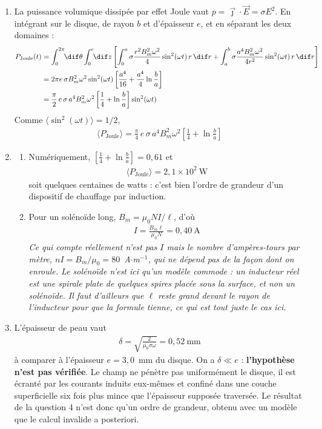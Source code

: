 \begin{correction}
\begin{enumerate}
	\item La puissance volumique dissipée par effet Joule vaut $p=\vec{\jmath}\cdot\vec{E}=\sigma E^2$. En intégrant sur le disque, de rayon $b$ et d'épaisseur $e$, et en séparant les deux domaines :
	\begin{align*}
		P_{\mathrm{Joule}}(t)&=\int_0^{2\pi}\!\!\dif\theta\int_0^e\!\!\dif z\left[\int_0^a\sigma\frac{r^2B_m^2\omega^2}{4}\sin^2(\omega t)\,r\,\dif r+\int_a^b\sigma\frac{a^4B_m^2\omega^2}{4r^2}\sin^2(\omega t)\,r\,\dif r\right]\\
		&=2\pi e\,\sigma B_m^2\omega^2\sin^2(\omega t)\left[\frac{a^4}{16}+\frac{a^4}{4}\ln\frac{b}{a}\right]\\
		&=\frac{\pi}{2}\,e\,\sigma\,a^4B_m^2\omega^2\left[\frac14+\ln\frac{b}{a}\right]\sin^2(\omega t)
	\end{align*}
	Comme $\langle\sin^2(\omega t)\rangle=1/2$,
	\begin{align*}
		\boxed{\langle P_{\mathrm{Joule}}\rangle=\frac{\pi}{4}\,e\,\sigma\,a^4B_m^2\omega^2\left[\frac14+\ln\frac{b}{a}\right]}
	\end{align*}

	\item
	\begin{enumerate}
		\item Numériquement, $\left[\frac14+\ln\frac{b}{a}\right]=0,61$ et
		\begin{align*}
			\boxed{\langle P_{\mathrm{Joule}}\rangle=2,1\times10^{2}~\mathrm{W}}
		\end{align*}
		soit quelques centaines de watts : c'est bien l'ordre de grandeur d'un dispositif de chauffage par induction.

		\item Pour un solénoïde long, $B_m=\mu_0NI/\ell$, d'où
		\begin{align*}
			\boxed{I=\frac{B_m\ell}{\mu_0N}=0,40~\mathrm{A}}
		\end{align*}
		\textit{Ce qui compte réellement n'est pas $I$ mais le nombre d'ampères-tours par mètre, $nI=B_m/\mu_0=80$~A$\cdot$m$^{-1}$, qui ne dépend pas de la façon dont on enroule. Le solénoïde n'est ici qu'un modèle commode : un inducteur réel est une spirale plate de quelques spires placée sous la surface, et non un solénoïde. Il faut d'ailleurs que $\ell$ reste grand devant le rayon de l'inducteur pour que la formule tienne, ce qui est tout juste le cas ici.}
	\end{enumerate}

	\item L'épaisseur de peau vaut
	\begin{align*}
		\boxed{\delta=\sqrt{\frac{2}{\mu_0\sigma\omega}}=0,52~\mathrm{mm}}
	\end{align*}
	à comparer à l'épaisseur $e=3,0$~mm du disque. On a $\delta\ll e$ : \textbf{l'hypothèse n'est pas vérifiée}. Le champ ne pénètre pas uniformément le disque, il est écranté par les courants induits eux-mêmes et confiné dans une couche superficielle six fois plus mince que l'épaisseur supposée traversée. Le résultat de la question 4 n'est donc qu'un ordre de grandeur, obtenu avec un modèle que le calcul invalide a posteriori.


\end{enumerate}
\end{correction}
